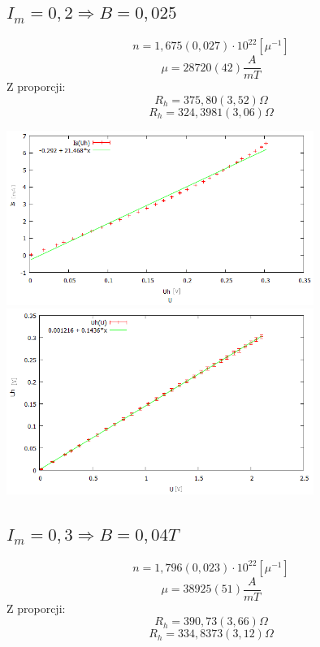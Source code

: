 \documentclass[10pt,a4paper]{article}
\begin{document}
\subsection{$I_m=0,2 \Rightarrow B=0,025$}
\begin{equation}
n = 1,675(0,027)\cdot 10^{22}[\mu^{-1}]
\end{equation} 
\begin{equation}
\mu = 28720(42)\frac{A}{mT}
\end{equation} 
Z proporcji:
\begin{equation}
R_h = 375,80(3,52)\Omega
\end{equation} 
\begin{equation}
R_h = 324,3981(3,06)\Omega
\end{equation} 

\includegraphics[width=10cm]{22.png}
\includegraphics[width=10cm]{12.png}

\subsection{$I_m=0,3 \Rightarrow B=0,04T$}
\begin{equation}
n = 1,796(0,023)\cdot 10^{22}[\mu^{-1}]
\end{equation} 
\begin{equation}
\mu = 38925(51)\frac{A}{mT}
\end{equation} 
Z proporcji:
\begin{equation}
R_h = 390,73(3,66)\Omega
\end{equation} 
\begin{equation}
R_h = 334,8373(3,12)\Omega
\end{equation} 
\end{document}
